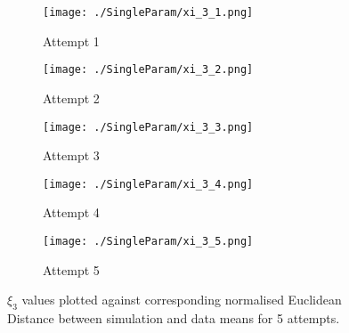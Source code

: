 \begin{figure}
    \begin{subfigure}{.5\textwidth}
      \centering
      \texttt{[image: ./SingleParam/xi\_3\_1.png]}
      \caption{Attempt 1}
      \label{singlexi:1}
    \end{subfigure}
    \begin{subfigure}{.5\textwidth}
      \centering
      \texttt{[image: ./SingleParam/xi\_3\_2.png]}
      \caption{Attempt 2}
      \label{singlexi:2}
    \end{subfigure}
    \begin{subfigure}{.5\textwidth}
        \centering
        \texttt{[image: ./SingleParam/xi\_3\_3.png]}
        \caption{Attempt 3}
        \label{singlexi:3}
    \end{subfigure}
    \begin{subfigure}{.5\textwidth} 
        \centering
        \texttt{[image: ./SingleParam/xi\_3\_4.png]}
        \caption{Attempt 4}
        \label{singlexi:4}
    \end{subfigure}
    \begin{subfigure}{.5\textwidth}
        \centering
        \texttt{[image: ./SingleParam/xi\_3\_5.png]}
        \caption{Attempt 5}
        \label{singlexi:5}
    \end{subfigure}

    \caption{$\xi_3$ values plotted against corresponding normalised Euclidean Distance between simulation and data means for 5 attempts.}
    \label{singlexi}
\end{figure}

